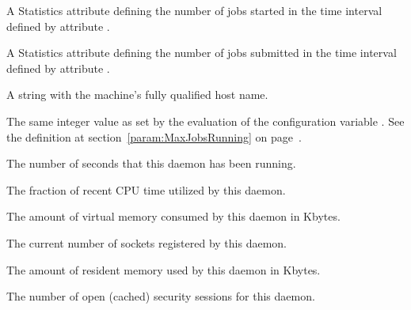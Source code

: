 \begin{description}
\item[\AdAttr{JobsStarted}:] A Statistics attribute defining
  the number of jobs started
  in the time interval defined by attribute .

\item[\AdAttr{JobsSubmitted}:] A Statistics attribute defining
  the number of jobs submitted
  in the time interval defined by attribute .

\item[\AdAttr{Machine}:] A string with the machine's fully qualified 
  host name.

\item[\AdAttr{MaxJobsRunning}:] The same integer value as set by the
  evaluation of the configuration variable .
  See the definition at section~\ref{param:MaxJobsRunning} on
  page~\pageref{param:MaxJobsRunning}.

\item[\AdAttr{MonitorSelfAge}:] The number of seconds that this daemon
  has been running.

\item[\AdAttr{MonitorSelfCPUUsage}:] The fraction of recent CPU time utilized
  by this daemon. 

\item[\AdAttr{MonitorSelfImageSize}:] The amount of virtual memory consumed by
  this daemon in Kbytes.

\item[\AdAttr{MonitorSelfRegisteredSocketCount}:] The current number of sockets
  registered by this daemon.

\item[\AdAttr{MonitorSelfResidentSetSize}:] The amount of resident memory
  used by this daemon in Kbytes.

\item[\AdAttr{MonitorSelfSecuritySessions}:] The number of open (cached)
  security sessions for this daemon.


\end{description}
